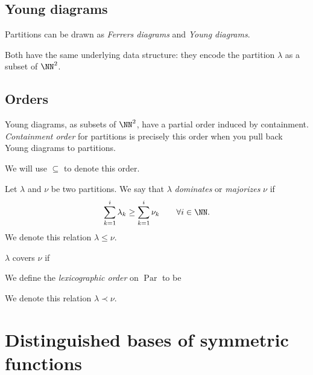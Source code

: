 \documentclass{article}
\DeclareMathOperator{\Par}{Par}
\begin{document}
\subsection{Young diagrams}
Partitions can be drawn as \textit{Ferrers diagrams} and \textit{Young diagrams}. 

Both have the same underlying data structure: they encode the partition $\lambda$ as a subset of $\NN^2$.

\subsection{Orders}

\begin{definition}
    Young diagrams, as subsets of $\NN^2$, have a partial order induced by containment. 
    \textit{Containment order} for partitions is precisely this order when you pull back Young diagrams to partitions.

    We will use $\subseteq$ to denote this order.
\end{definition}

\begin{definition}
    Let $\lambda$ and $\nu$ be two partitions. We say that $\lambda$ \textit{dominates} or \textit{majorizes} $\nu$ if
    \[
        \sum_{k=1}^i \lambda_k \geq \sum_{k=1}^i \nu_k \qquad \forall i\in\NN.
    \]
    We denote this relation $\lambda \leq \nu$.
\end{definition}

\begin{theorem}
    $\lambda$ covers $\nu$ if
\end{theorem}

\begin{definition}
    We define the \textit{lexicographic order} on $\Par$ to be

    We denote this relation $\lambda \prec \nu$.
\end{definition}

\begin{theorem}
\end{theorem}

\begin{theorem}
\end{theorem}

\section{Distinguished bases of symmetric functions}
\end{document}
